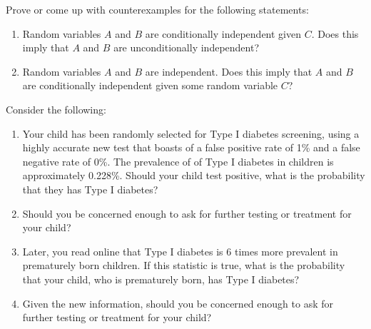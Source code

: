 \documentclass{harvardml}
\theoremstyle{definition}
\theoremstyle{plain}
\begin{document}
		    
\begin{problem}
    Prove or come up with counterexamples for the following statements:
    \begin{enumerate}[label=(\alph*)]
        \item  Random variables $A$ and $B$ are conditionally independent given $C$.  Does this imply that $A$ and $B$ are unconditionally independent?
        \item  Random variables $A$ and $B$ are independent.  Does this imply that $A$ and $B$ are conditionally independent given some random variable $C$?
    \end{enumerate}

\end{problem}

\begin{problem}
Consider the following:
\begin{enumerate}[label=(\alph*)]
\item Your child has been randomly selected for Type I diabetes screening, using
a highly accurate new test that boasts of a false positive rate of 1\% and a
false negative rate of 0\%. The prevalence of of Type I diabetes in children is
approximately 0.228\%. Should your child test positive, what is the probability
that they has Type I diabetes?

\item Should you be concerned enough to ask for further testing or treatment for
your child?

\item Later, you read online that Type I diabetes is 6 times more prevalent in
prematurely born children. If this statistic is true, what is the probability
that your child, who is prematurely born, has Type I diabetes?

\item Given the new information, should you be concerned enough to ask for
further testing or treatment for your child?
\end{enumerate}
\end{problem}
\end{document}
